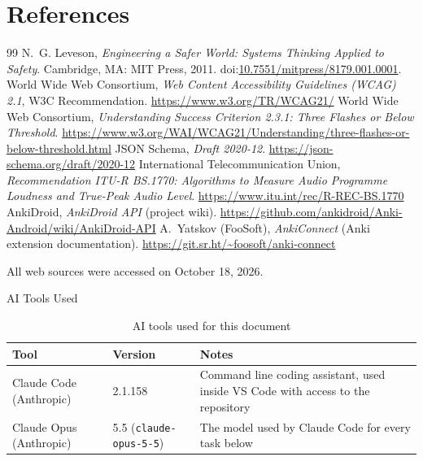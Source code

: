\documentclass{article}
\begin{document}
\section*{References}

\begingroup
\renewcommand{\section}[2]{}
\begin{thebibliography}{99}
 N.~G. Leveson, \emph{Engineering a Safer World: Systems
  Thinking Applied to Safety}. Cambridge, MA: MIT Press, 2011.
  doi:\href{https://doi.org/10.7551/mitpress/8179.001.0001}{10.7551/mitpress/8179.001.0001}.
 World Wide Web Consortium, \emph{Web Content Accessibility
  Guidelines (WCAG) 2.1}, W3C Recommendation.
  \url{https://www.w3.org/TR/WCAG21/}
 World Wide Web Consortium, \emph{Understanding Success
  Criterion 2.3.1: Three Flashes or Below Threshold}.
  \url{https://www.w3.org/WAI/WCAG21/Understanding/three-flashes-or-below-threshold.html}
 JSON Schema, \emph{Draft 2020-12}.
  \url{https://json-schema.org/draft/2020-12}
 International Telecommunication Union, \emph{Recommendation
  ITU-R BS.1770: Algorithms to Measure Audio Programme Loudness and True-Peak
  Audio Level}. \url{https://www.itu.int/rec/R-REC-BS.1770}
 AnkiDroid, \emph{AnkiDroid API} (project wiki).
  \url{https://github.com/ankidroid/Anki-Android/wiki/AnkiDroid-API}
 A.~Yatskov (FooSoft), \emph{AnkiConnect} (Anki
  extension documentation). \url{https://git.sr.ht/~foosoft/anki-connect}
\end{thebibliography}
\endgroup

All web sources were accessed on October 18, 2026.

\newpage{}

\section{Appendix:  Generative AI Use Disclosure}

\subsection{AI Tools Used}

\begin{table}[h!]
\caption{AI tools used for this document} \label{TblAITools}
\begin{tabularx}{\textwidth}{llX}
\toprule
\textbf{Tool} & \textbf{Version} & \textbf{Notes}\\
\midrule
Claude Code (Anthropic) & 2.1.158 & Command line coding assistant, used inside
VS Code with access to the repository\\
Claude Opus (Anthropic) & 5.5 (\texttt{claude-opus-5-5}) & The model used by
Claude Code for every task below\\
\bottomrule
\end{tabularx}
\end{table}
\end{document}
